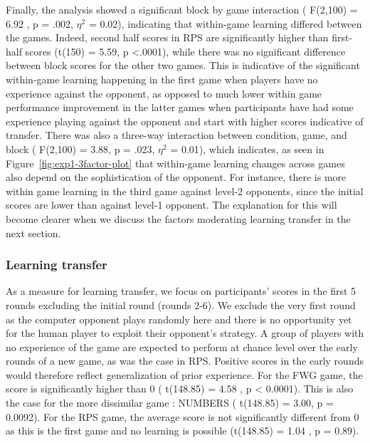 \documentclass[man,floatsintext]{apa6}
\begin{document}
Finally, the analysis showed a significant block by game interaction ( F(2,100) = 6.92 , p = .002, \(\eta^{2}\) = 0.02), indicating that within-game learning differed between the games. Indeed, second half scores in RPS are significantly higher than first-half scores (t(150) = 5.59, p \textless{}.0001), while there was no significant difference between block scores for the other two games. This is indicative of the significant within-game learning happening in the first game when players have no experience against the opponent, as opposed to much lower within game performance improvement in the latter games when participants have had some experience playing against the opponent and start with higher scores indicative of transfer. There was also a three-way interaction between condition, game, and block ( F(2,100) = 3.88, p = .023, \(\eta^{2}\) = 0.01), which indicates, as seen in Figure~\ref{fig:exp1-3factor-plot} that within-game learning changes across games also depend on the sophistication of the opponent. For instance, there is more within game learning in the third game against level-2 opponents, since the initial scores are lower than against level-1 opponent. The explanation for this will become clearer when we discuss the factors moderating learning transfer in the next section.

\hypertarget{learning-transfer}{%
\subsubsection{Learning transfer}\label{learning-transfer}}

As a measure for learning transfer, we focus on participants' scores in the first 5 rounds excluding the initial round (rounds 2-6). We exclude the very first round as the computer opponent plays randomly here and there is no opportunity yet for the human player to exploit their opponent's strategy. A group of players with no experience of the game are expected to perform at chance level over the early rounds of a new game, as was the case in RPS. Positive scores in the early rounds would therefore reflect generalization of prior experience. For the FWG game, the score is significantly higher than 0 ( t(148.85) = 4.58 , p \textless{} 0.0001). This is also the case for the more dissimilar game : NUMBERS ( t(148.85) = 3.00, p = 0.0092). For the RPS game, the average score is not significantly different from 0 as this is the first game and no learning is possible (t(148.85) = 1.04 , p = 0.89).
\end{document}
